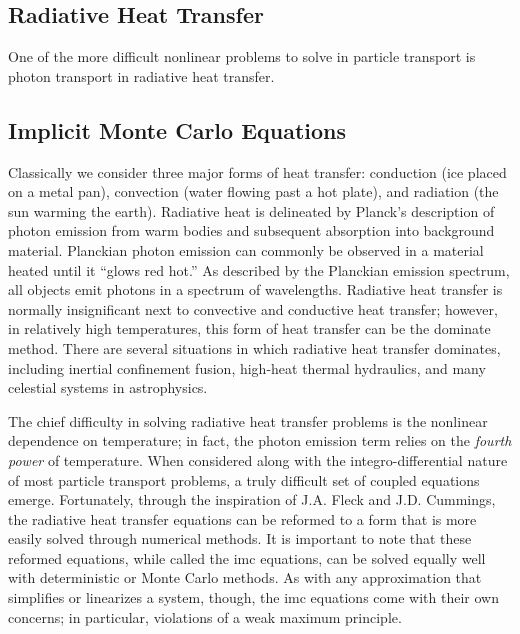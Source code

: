 \subsection{Radiative Heat Transfer}
One of the more difficult nonlinear problems to solve in particle transport is photon transport in radiative heat transfer.

\subsection{Implicit Monte Carlo Equations}
  Classically we consider three major forms of heat transfer: conduction (ice placed on a metal pan), convection (water flowing past a hot plate), and radiation (the sun warming the earth). Radiative heat is delineated by Planck's description of photon emission from warm bodies and subsequent absorption into background material.  Planckian photon emission can commonly be observed in a material heated until it ``glows red hot.''  As described by the Planckian emission spectrum, all objects emit photons in a spectrum of wavelengths.  Radiative heat transfer is normally insignificant next to convective and conductive heat transfer; however, in relatively high temperatures, this form of heat transfer can be the dominate method.  There are several situations in which radiative heat transfer dominates, including inertial confinement fusion, high-heat thermal hydraulics, and many celestial systems in astrophysics.

The chief difficulty in solving radiative heat transfer problems is the nonlinear dependence on temperature; in fact, the photon emission term relies on the \emph{fourth power} of temperature.  When considered along with the integro-differential nature of most particle transport problems, a truly difficult set of coupled equations emerge.  Fortunately, through the inspiration of J.A. Fleck and J.D. Cummings, the radiative heat transfer equations can be reformed to a form that is more easily solved through numerical methods.  It is important to note that these reformed equations, while called the \gls{imc} equations, can be solved equally well with deterministic or Monte Carlo methods.  As with any approximation that simplifies or linearizes a system, though, the \gls{imc} equations come with their own concerns; in particular, violations of a weak maximum principle.
 


